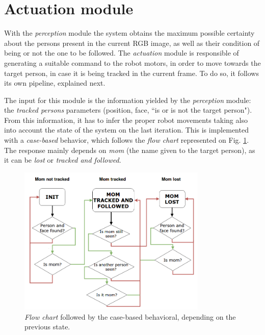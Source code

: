 \section{Actuation module}

With the \emph{perception} module the system obtains the maximum possible certainty about the persons present in the current RGB image, as well as their condition of being or not the one to be followed. The \emph{actuation} module is responsible of generating a suitable command to the robot motors, in order to move towards the target person, in case it is being tracked in the current frame. To do so, it follows its own pipeline, explained next.

The input for this module is the information yielded by the \emph{perception} module: the \emph{tracked persons} parameters (position, face, ``is or is not the target person"). From this information, it has to infer the proper robot movements taking also into account the state of the system on the last iteration. This is implemented with a \emph{case-based} behavior, which follows the \emph{flow chart} represented on Fig. \ref{fig:actuation_flow}. The response mainly depends on \emph{mom} (the name given to the target person), as it can be \emph{lost} or \emph{tracked and followed}.\\

\begin{figure}[h]
	\centering
	\includegraphics[width=9cm]{images/flowchart}
	\caption{\emph{Flow chart} followed by the case-based behavioral, depending on the previous state.}
	\label{fig:actuation_flow}
\end{figure}

